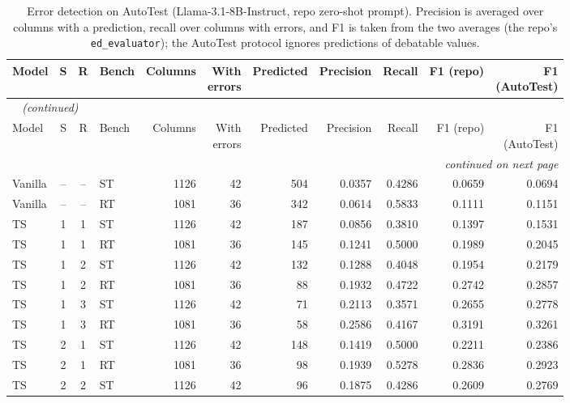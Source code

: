 {\footnotesize
{}
\setlength{\tabcolsep}{4.2pt}
\begin{longtable}{@{}lcclrrrrrrr@{}}
\caption{Error detection on AutoTest (Llama-3.1-8B-Instruct, repo zero-shot prompt). Precision is averaged over columns with a prediction, recall over columns with errors, and F1 is taken from the two averages (the repo's \texttt{ed\_evaluator}); the AutoTest protocol ignores predictions of debatable values.}\label{tab:gen-ed}\\
\toprule
\rowcolor{headshade}Model & S & R & Bench & Columns & \makecell{With\\errors} & Predicted & Precision & Recall & F1 (repo) & \makecell{F1\\(AutoTest)}\\
\midrule
\endfirsthead
\multicolumn{11}{l}{\textit{\tablename~\thetable{} (continued)}}\\
\toprule
\rowcolor{headshade}Model & S & R & Bench & Columns & \makecell{With\\errors} & Predicted & Precision & Recall & F1 (repo) & \makecell{F1\\(AutoTest)}\\
\midrule
\endhead
\midrule
\multicolumn{11}{r}{\textit{continued on next page}}\\
\endfoot
\bottomrule
\endlastfoot
Vanilla & -- & -- & ST & 1126 & 42 & 504 & 0.0357 & 0.4286 & 0.0659 & 0.0694\\
Vanilla & -- & -- & RT & 1081 & 36 & 342 & 0.0614 & 0.5833 & 0.1111 & 0.1151\\
\midrule
TS & 1 & 1 & ST & 1126 & 42 & 187 & 0.0856 & 0.3810 & 0.1397 & 0.1531\\
TS & 1 & 1 & RT & 1081 & 36 & 145 & 0.1241 & 0.5000 & 0.1989 & 0.2045\\
TS & 1 & 2 & ST & 1126 & 42 & 132 & 0.1288 & 0.4048 & 0.1954 & 0.2179\\
TS & 1 & 2 & RT & 1081 & 36 & 88 & 0.1932 & 0.4722 & 0.2742 & 0.2857\\
TS & 1 & 3 & ST & 1126 & 42 & 71 & 0.2113 & 0.3571 & 0.2655 & 0.2778\\
TS & 1 & 3 & RT & 1081 & 36 & 58 & 0.2586 & 0.4167 & 0.3191 & 0.3261\\
TS & 2 & 1 & ST & 1126 & 42 & 148 & 0.1419 & 0.5000 & 0.2211 & 0.2386\\
TS & 2 & 1 & RT & 1081 & 36 & 98 & 0.1939 & 0.5278 & 0.2836 & 0.2923\\
TS & 2 & 2 & ST & 1126 & 42 & 96 & 0.1875 & 0.4286 & 0.2609 & 0.2769\\

\end{longtable}}
